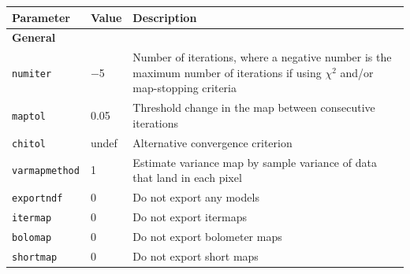 \documentclass[twoside,11pt]{article}
\newenvironment{latexonly}{}{}
\renewcommand{\_}{\texttt{\symbol{95}}}
\newcommand{\param}[1]{\texttt{#1}}
\begin{document}
\begin{latexonly}
\begin{table}[h]
\begin{center}
\begin{small}
\begin{tabular}{|p{2.5cm}|p{1.0cm}|p{11.2cm}|}
\hline
Parameter & Value & Description \\
\hline
\multicolumn{3}{|l|}{\textbf{General}}\\
\hline
\param{numiter}       & $-$5 & Number of iterations, where a negative number
                               is the maximum number of iterations
                               if using $\chi^2$ and/or map-stopping criteria \\
\param{maptol}        & 0.05 & Threshold change in the map between consecutive
                               iterations \\
\param{chitol}        & undef& Alternative convergence criterion \\
\param{varmapmethod}  &    1 & Estimate variance map by sample variance of data that
                               land in each pixel \\

\param{exportndf}     &    0 & Do not export any models \\
\param{itermap}       &    0 & Do not export itermaps \\
\param{bolomap}       &    0 & Do not export bolometer maps \\
\param{shortmap}      &    0 & Do not export short maps \\


\end{tabular}
\end{small}
\end{center}
\end{table}
\end{latexonly}
\end{document}
